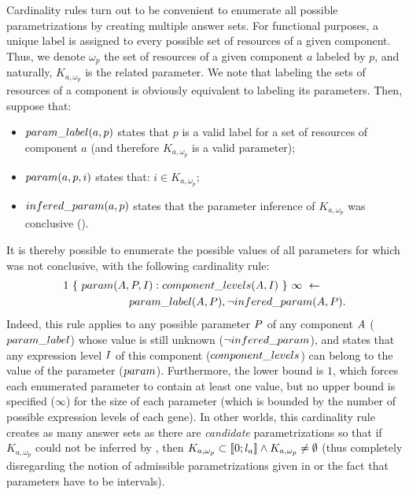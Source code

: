 Cardinality rules turn out to be convenient to enumerate all possible parametrizations by creating multiple answer sets.
For functional purposes, a unique label is assigned to every possible set of resources of a given component.
Thus, we denote $\omega_p$ the set of resources of a given component $a$ labeled by $p$,
and naturally, $K_{a,\omega_p}$ is the related parameter.
We note that labeling the sets of resources of a component is obviously equivalent to labeling its parameters.
Then, suppose that:
\begin{itemize}
  \item $param\_label(a, p)$ states that $p$ is a valid label for a set of resources of component $a$ (and therefore $K_{a,\omega_p}$ is a valid parameter);
  \item $param(a, p, i)$ states that: $i \in K_{a, \omega_p}$;
  \item $infered\_param(a, p)$ states that the parameter inference of $K_{a, \omega_p}$ was conclusive ().
\end{itemize}
It is thereby possible to enumerate the possible values of all parameters for which  was not conclusive, with the following cardinality rule:
\begin{align*}
  & 1\ \{\ param(A, P, I) : component\_levels(A, I)\ \}\ \infty\ \leftarrow \\
  & \qquad\qquad\qquad param\_label(A, P), \neg infered\_param(A, P).
\end{align*}
Indeed, this rule applies to any possible parameter $P$ of any component $A$ ($param\_label$) whose value is still unknown ($\neg infered\_param$),
and states that any expression level $I$ of this component ($component\_levels$) can belong to the value of the parameter ($param$).
Furthermore, the lower bound is $1$, which forces each enumerated parameter to contain at least one value,
but no upper bound is specified ($\infty$) for the size of each parameter (which is bounded by the number of possible expression levels of each gene).
In other worlds, this cardinality rule creates as many answer sets as there are \emph{candidate} parametrizations
so that if $K_{a, \omega_p}$ could not be inferred by , then
$K_{a, \omega_p} \subset \llbracket 0 ; l_a \rrbracket \wedge K_{a, \omega_p} \neq \emptyset$
(thus completely disregarding the notion of admissible parametrizations given in  or the fact that parameters have to be intervals).


